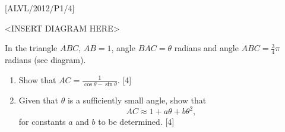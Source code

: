 \item {[}ALVL/2012/P1/4{]}
\noindent \begin{center}
<INSERT DIAGRAM HERE>
\par\end{center}

In the triangle $ABC$, $AB=1$, angle $BAC=\theta$ radians and angle
$ABC=\frac{3}{4}\pi$ radians (see diagram). 
\begin{enumerate}
\item Show that $AC=\frac{1}{\cos\theta-\sin\theta}$. \hfill{}{[}4{]}
\item Given that $\theta$ is a sufficiently small angle, show that 
\[
AC\approx1+a\theta+b\theta^{2},
\]
for constants $a$ and $b$ to be determined. \hfill{} {[}4{]}
\end{enumerate}
